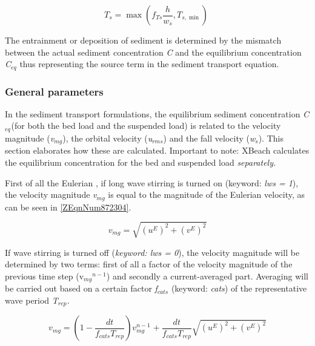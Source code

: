 \documentclass{article}
\begin{document}
\noindent 
\begin{equation} \label{2.77)} 
T_{s} =\max \left(f_{Ts} \frac{h}{w_{s} } ,T_{s,\min } \right)\;  
\end{equation} 


\noindent The entrainment or deposition of sediment is determined by the mismatch between the actual sediment concentration \textit{C} and the equilibrium concentration \textit{C${}_{eq}$ }thus representing the source term in the sediment transport equation. 


\subsubsection{ General parameters}

\noindent In the sediment transport formulations, the equilibrium sediment concentration \textit{C${}_{eq}$}${}_{ }$(for both the bed load and the suspended load) is related to the velocity magnitude (\textit{v${}_{mg}$}), the orbital velocity (\textit{u${}_{rms}$}) and the fall velocity (\textit{w${}_{s}$}). This section elaborates how these are calculated.   Important to note: XBeach calculates the equilibrium concentration for the bed and suspended load \textit{separately.}  

\noindent 

\noindent First of all the Eulerian , if long wave stirring is turned on (keyword: \textit{lws = 1}), the velocity magnitude \textit{v${}_{mg}$} is equal to the magnitude of the Eulerian velocity, as can be seen in \eqref{ZEqnNum872304}.

\noindent 
\begin{equation} \label{ZEqnNum872304} 
v_{mg} =\sqrt{\left(u^{E} \right)^{2} +\left(v^{E} \right)^{2} }  
\end{equation} 


\noindent If wave stirring is turned off (\textit{keyword: lws = 0}), the velocity magnitude will be determined by two terms: first of all a factor of the velocity magnitude of the previous time step (v${}_{mg}$${}^{n-1}$) and secondly a current-averaged part. Averaging will be carried out based on a certain factor \textit{f${}_{cats}$} (keyword: \textit{cats}) of the representative wave period \textit{T${}_{rep}$.}

\noindent 
\begin{equation} \label{2.79)} 
v_{mg} =\left(1-\frac{dt}{f_{cats} T_{rep} } \right)v_{mg}^{n-1} _{} +\frac{dt}{f_{cats} T_{rep} } \sqrt{\left(u^{E} \right)^{2} +\left(v^{E} \right)^{2} }  
\end{equation} 
\end{document}
